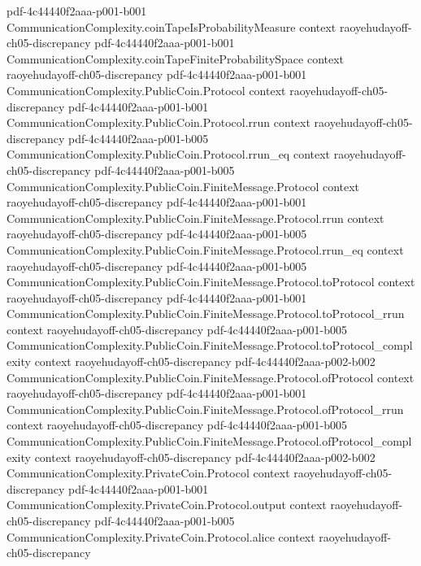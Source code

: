 \begin{lemma}
  {pdf-4c44440f2aaa-p001-b001}
\proofstep
  {CommunicationComplexity.coinTapeIsProbabilityMeasure}
  {context}
  {raoyehudayoff-ch05-discrepancy}
  {pdf-4c44440f2aaa-p001-b001}
\proofstep
  {CommunicationComplexity.coinTapeFiniteProbabilitySpace}
  {context}
  {raoyehudayoff-ch05-discrepancy}
  {pdf-4c44440f2aaa-p001-b001}
\proofstep
  {CommunicationComplexity.PublicCoin.Protocol}
  {context}
  {raoyehudayoff-ch05-discrepancy}
  {pdf-4c44440f2aaa-p001-b001}
\proofstep
  {CommunicationComplexity.PublicCoin.Protocol.rrun}
  {context}
  {raoyehudayoff-ch05-discrepancy}
  {pdf-4c44440f2aaa-p001-b005}
\proofstep
  {CommunicationComplexity.PublicCoin.Protocol.rrun_eq}
  {context}
  {raoyehudayoff-ch05-discrepancy}
  {pdf-4c44440f2aaa-p001-b005}
\proofstep
  {CommunicationComplexity.PublicCoin.FiniteMessage.Protocol}
  {context}
  {raoyehudayoff-ch05-discrepancy}
  {pdf-4c44440f2aaa-p001-b001}
\proofstep
  {CommunicationComplexity.PublicCoin.FiniteMessage.Protocol.rrun}
  {context}
  {raoyehudayoff-ch05-discrepancy}
  {pdf-4c44440f2aaa-p001-b005}
\proofstep
  {CommunicationComplexity.PublicCoin.FiniteMessage.Protocol.rrun_eq}
  {context}
  {raoyehudayoff-ch05-discrepancy}
  {pdf-4c44440f2aaa-p001-b005}
\proofstep
  {CommunicationComplexity.PublicCoin.FiniteMessage.Protocol.toProtocol}
  {context}
  {raoyehudayoff-ch05-discrepancy}
  {pdf-4c44440f2aaa-p001-b001}
\proofstep
  {CommunicationComplexity.PublicCoin.FiniteMessage.Protocol.toProtocol_rrun}
  {context}
  {raoyehudayoff-ch05-discrepancy}
  {pdf-4c44440f2aaa-p001-b005}
\proofstep
  {CommunicationComplexity.PublicCoin.FiniteMessage.Protocol.toProtocol_complexity}
  {context}
  {raoyehudayoff-ch05-discrepancy}
  {pdf-4c44440f2aaa-p002-b002}
\proofstep
  {CommunicationComplexity.PublicCoin.FiniteMessage.Protocol.ofProtocol}
  {context}
  {raoyehudayoff-ch05-discrepancy}
  {pdf-4c44440f2aaa-p001-b001}
\proofstep
  {CommunicationComplexity.PublicCoin.FiniteMessage.Protocol.ofProtocol_rrun}
  {context}
  {raoyehudayoff-ch05-discrepancy}
  {pdf-4c44440f2aaa-p001-b005}
\proofstep
  {CommunicationComplexity.PublicCoin.FiniteMessage.Protocol.ofProtocol_complexity}
  {context}
  {raoyehudayoff-ch05-discrepancy}
  {pdf-4c44440f2aaa-p002-b002}
\proofstep
  {CommunicationComplexity.PrivateCoin.Protocol}
  {context}
  {raoyehudayoff-ch05-discrepancy}
  {pdf-4c44440f2aaa-p001-b001}
\proofstep
  {CommunicationComplexity.PrivateCoin.Protocol.output}
  {context}
  {raoyehudayoff-ch05-discrepancy}
  {pdf-4c44440f2aaa-p001-b005}
\proofstep
  {CommunicationComplexity.PrivateCoin.Protocol.alice}
  {context}
  {raoyehudayoff-ch05-discrepancy}

\end{lemma}
